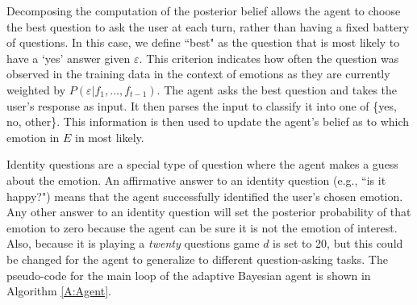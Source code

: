 \documentclass[a4paper]{article}
\begin{document}
Decomposing the computation of the posterior belief allows the agent to choose
the best question to ask the user at each turn, rather than having a fixed
battery of questions.  In this case, we define ``best" as the question that is
most likely to have a `yes' answer given $\varepsilon$. This criterion
indicates how often the question was observed in the training data in the
context of emotions as they are currently weighted by
$P(\varepsilon|f_1,...,f_{t-1})$.  The agent asks the best question and takes
the user's response as input.  It then parses the input to classify it into
one of \{yes, no, other\}.  This information is then used to update the agent's
belief as to which emotion in $E$ in most likely.



Identity questions are a special type of question where the agent makes a
guess about the emotion. An affirmative answer to an identity question (e.g.,
``is it happy?") means that the agent successfully identified the user's
chosen emotion.  Any other answer to an identity question will set the
posterior probability of that emotion to zero because the agent can be sure it
is not the emotion of interest.  Also, because it is playing a \textsl{twenty}
questions game $d$ is set to 20, but this could be changed for the agent to
generalize to different question-asking tasks.  The pseudo-code for the main
loop of the adaptive Bayesian agent is shown in Algorithm \ref{A:Agent}.
\end{document}
